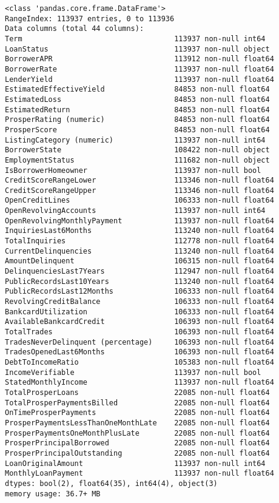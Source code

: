 \documentclass[11pt]{article}
\begin{document}
    \begin{Verbatim}[commandchars=\\\{\}]
<class 'pandas.core.frame.DataFrame'>
RangeIndex: 113937 entries, 0 to 113936
Data columns (total 44 columns):
Term                                   113937 non-null int64
LoanStatus                             113937 non-null object
BorrowerAPR                            113912 non-null float64
BorrowerRate                           113937 non-null float64
LenderYield                            113937 non-null float64
EstimatedEffectiveYield                84853 non-null float64
EstimatedLoss                          84853 non-null float64
EstimatedReturn                        84853 non-null float64
ProsperRating (numeric)                84853 non-null float64
ProsperScore                           84853 non-null float64
ListingCategory (numeric)              113937 non-null int64
BorrowerState                          108422 non-null object
EmploymentStatus                       111682 non-null object
IsBorrowerHomeowner                    113937 non-null bool
CreditScoreRangeLower                  113346 non-null float64
CreditScoreRangeUpper                  113346 non-null float64
OpenCreditLines                        106333 non-null float64
OpenRevolvingAccounts                  113937 non-null int64
OpenRevolvingMonthlyPayment            113937 non-null float64
InquiriesLast6Months                   113240 non-null float64
TotalInquiries                         112778 non-null float64
CurrentDelinquencies                   113240 non-null float64
AmountDelinquent                       106315 non-null float64
DelinquenciesLast7Years                112947 non-null float64
PublicRecordsLast10Years               113240 non-null float64
PublicRecordsLast12Months              106333 non-null float64
RevolvingCreditBalance                 106333 non-null float64
BankcardUtilization                    106333 non-null float64
AvailableBankcardCredit                106393 non-null float64
TotalTrades                            106393 non-null float64
TradesNeverDelinquent (percentage)     106393 non-null float64
TradesOpenedLast6Months                106393 non-null float64
DebtToIncomeRatio                      105383 non-null float64
IncomeVerifiable                       113937 non-null bool
StatedMonthlyIncome                    113937 non-null float64
TotalProsperLoans                      22085 non-null float64
TotalProsperPaymentsBilled             22085 non-null float64
OnTimeProsperPayments                  22085 non-null float64
ProsperPaymentsLessThanOneMonthLate    22085 non-null float64
ProsperPaymentsOneMonthPlusLate        22085 non-null float64
ProsperPrincipalBorrowed               22085 non-null float64
ProsperPrincipalOutstanding            22085 non-null float64
LoanOriginalAmount                     113937 non-null int64
MonthlyLoanPayment                     113937 non-null float64
dtypes: bool(2), float64(35), int64(4), object(3)
memory usage: 36.7+ MB

    \end{Verbatim}
\end{document}
